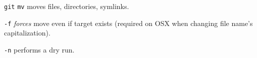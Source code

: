 %

\begin{compactenum}
\item [\texttt{git}] \texttt{mv} moves files, directories, symlinks.
\item [\texttt{-f}] \emph{forces} move even if target exists (required on OSX when changing file name's capitalization).
\item [\texttt{-n}] performs a dry run.
\end{compactenum}

%